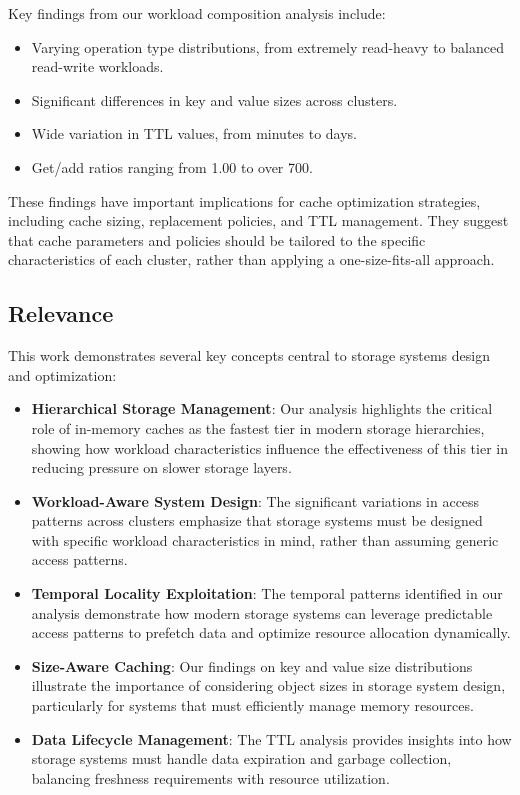 \documentclass[conference]{IEEEtran}
\begin{document}
Key findings from our workload composition analysis include:
\begin{itemize}
    \item Varying operation type distributions, from extremely read-heavy to balanced read-write workloads.
    \item Significant differences in key and value sizes across clusters.
    \item Wide variation in TTL values, from minutes to days.
    \item Get/add ratios ranging from 1.00 to over 700.
\end{itemize}

These findings have important implications for cache optimization strategies, including cache sizing, replacement policies, and TTL management. They suggest that cache parameters and policies should be tailored to the specific characteristics of each cluster, rather than applying a one-size-fits-all approach.

\subsection{Relevance}
This work demonstrates several key concepts central to storage systems design and optimization:
\begin{itemize}
    \item \textbf{Hierarchical Storage Management}: Our analysis highlights the critical role of in-memory caches as the fastest tier in modern storage hierarchies, showing how workload characteristics influence the effectiveness of this tier in reducing pressure on slower storage layers.
    
    \item \textbf{Workload-Aware System Design}: The significant variations in access patterns across clusters emphasize that storage systems must be designed with specific workload characteristics in mind, rather than assuming generic access patterns.
    
    \item \textbf{Temporal Locality Exploitation}: The temporal patterns identified in our analysis demonstrate how modern storage systems can leverage predictable access patterns to prefetch data and optimize resource allocation dynamically.
    
    \item \textbf{Size-Aware Caching}: Our findings on key and value size distributions illustrate the importance of considering object sizes in storage system design, particularly for systems that must efficiently manage memory resources.
    
    \item \textbf{Data Lifecycle Management}: The TTL analysis provides insights into how storage systems must handle data expiration and garbage collection, balancing freshness requirements with resource utilization.
\end{itemize}
\end{document}

